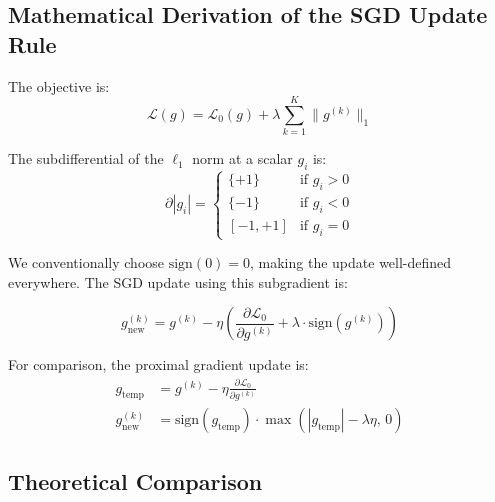 \documentclass[12pt,a4paper]{article}
\theoremstyle{definition}
\begin{document}
\subsection{Mathematical Derivation of the SGD Update Rule}

The objective is:
\begin{equation}
\mathcal{L}(g) = \mathcal{L}_0(g) + \lambda \sum_{k=1}^{K} \|g^{(k)}\|_1
\end{equation}

The subdifferential of the $\ell_1$ norm at a scalar $g_i$ is:
\begin{equation}
\partial |g_i| = \begin{cases} \{+1\} & \text{if } g_i > 0 \\ \{-1\} & \text{if } g_i < 0 \\ [-1, +1] & \text{if } g_i = 0 \end{cases}
\end{equation}

We conventionally choose $\text{sign}(0) = 0$, making the update well-defined everywhere. The SGD update using this subgradient is:

\begin{equation}
\boxed{g_{\text{new}}^{(k)} = g^{(k)} - \eta \left(\frac{\partial \mathcal{L}_0}{\partial g^{(k)}} + \lambda \cdot \text{sign}(g^{(k)})\right)}
\end{equation}

For comparison, the proximal gradient update is:
\begin{align}
g_{\text{temp}} &= g^{(k)} - \eta \frac{\partial \mathcal{L}_0}{\partial g^{(k)}} \\
g_{\text{new}}^{(k)} &= \text{sign}(g_{\text{temp}}) \cdot \max\!\left(|g_{\text{temp}}| - \lambda \eta,\, 0\right)
\end{align}

\subsection{Theoretical Comparison}
\end{document}
